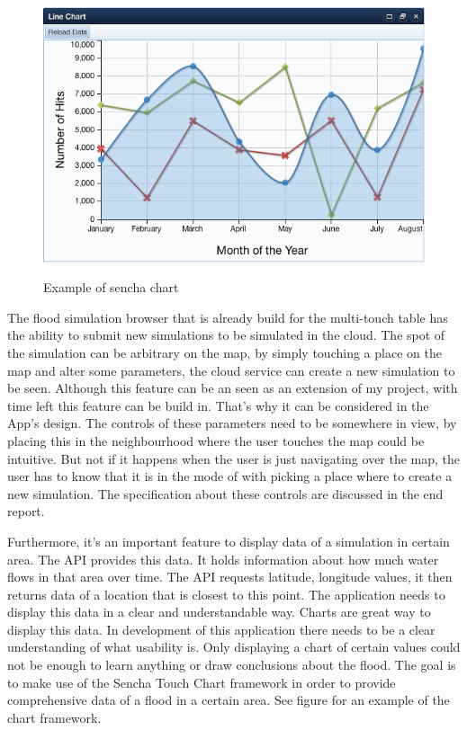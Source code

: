 \begin{figure}[ht]
	\includegraphics[scale=0.5]{chart.png} \\
\caption{Example of sencha chart}
\label{fig:sencha chart}
\end{figure}

The flood simulation browser that is already build for the multi-touch table has the ability to submit new simulations to be simulated in the cloud. The spot of the simulation can be arbitrary on the map, by simply touching a place on the map and alter some parameters, the cloud service can create a new simulation to be seen. Although this feature can be an seen as an extension of my project, with time left this feature can be build in. That's why it can be considered in the App's design. The controls of these parameters need to be somewhere in view, by placing this in the neighbourhood where the user touches the map could be intuitive. But not if it happens when the user is just navigating over the map, the user has to know that it is in the mode of with picking a place where to create a new simulation. The specification about these controls are discussed in the end report.

Furthermore, it's an important feature to display data of a simulation in certain area. The API provides this data. It holds information about how much water flows in that area over time. The API requests latitude, longitude values, it then returns data of a location that is closest to this point. The application needs to display this data in a clear and understandable way. Charts are great way to display this data. In development of this application there needs to be a clear understanding of what usability is. Only displaying a chart of certain values could not be enough to learn anything or draw conclusions about the flood. The goal is to make use of the Sencha Touch Chart framework in order to provide comprehensive data of a flood in a certain area. See figure \label{fig:sencha chart} for an example of the chart framework.

